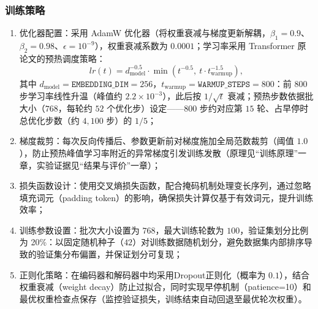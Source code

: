 \subsubsection{训练策略}
\begin{enumerate}[label={（\arabic*）}, leftmargin=2em, labelsep=0.5em, itemsep=0pt]
    \item 优化器配置：采用 AdamW 优化器（将权重衰减与梯度更新解耦，$\beta_1=0.9$、$\beta_2=0.98$、$\epsilon=10^{-9}$），权重衰减系数为 $0.0001$；学习率采用 Transformer 原论文的预热调度策略\supercite{vaswaniAttentionAllYou2017}：
    \begin{equation}
        lr(t) = d_{\text{model}}^{-0.5} \cdot \min\left(t^{-0.5},\ t \cdot t_{\text{warmup}}^{-1.5}\right),
    \end{equation}
    其中 $d_{\text{model}}=\texttt{EMBEDDING\_DIM}=256$，$t_{\text{warmup}}=\texttt{WARMUP\_STEPS}=800$：前 $800$ 步学习率线性升温（峰值约 $2.2\times10^{-3}$），此后按 $1/\sqrt{t}$ 衰减；预热步数依据批大小（$768$，每轮约 $52$ 个优化步）设定——$800$ 步约对应第 $15$ 轮、占早停时总优化步数（约 $4{,}100$ 步）的 $1/5$；
    \item 梯度裁剪：每次反向传播后、参数更新前对梯度施加全局范数裁剪（阈值 $1.0$），防止预热峰值学习率附近的异常梯度引发训练发散（原理见“训练原理”一章，实验证据见“结果与评价”一章）；
    \item 损失函数设计：使用交叉熵损失函数，配合掩码机制处理变长序列，通过忽略填充词元（padding token）的影响，确保损失计算仅基于有效词元，提升训练效率；
    \item 训练参数设置：批次大小设置为 $768$，最大训练轮数为 $100$，验证集划分比例为 20\%：以固定随机种子（$42$）对训练数据随机划分，避免数据集内部排序导致的验证集分布偏置，并保证划分可复现；
    \item 正则化策略：在编码器和解码器中均采用Dropout正则化（概率为 $0.1$），结合权重衰减（weight decay）防止过拟合，同时实现早停机制（patience=10）和最优权重检查点保存（监控验证损失，训练结束自动回退至最优轮次权重）。
\end{enumerate}

